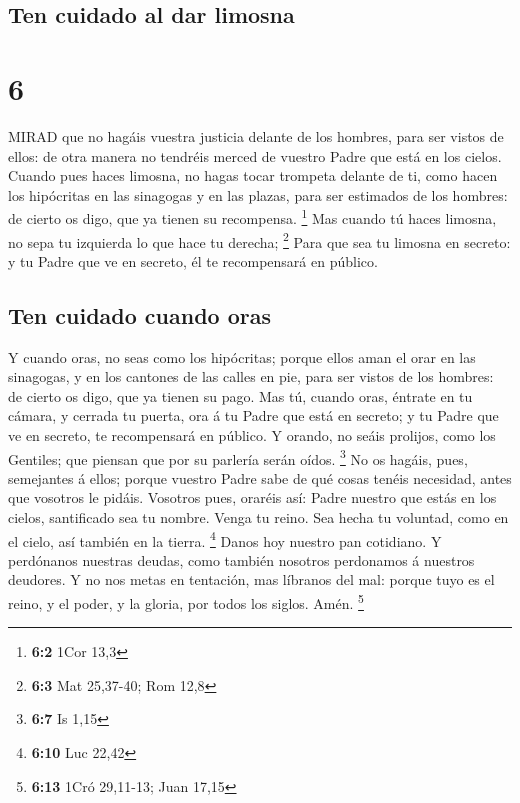 \hypertarget{ten-cuidado-al-dar-limosna}{%
\subsection{Ten cuidado al dar
limosna}\label{ten-cuidado-al-dar-limosna}}

\hypertarget{section-5}{%
\section{6}\label{section-5}}

 MIRAD que no hagáis vuestra justicia delante de los
hombres, para ser vistos de ellos: de otra manera no tendréis merced de
vuestro Padre que está en los cielos.  Cuando pues haces
limosna, no hagas tocar trompeta delante de ti, como hacen los
hipócritas en las sinagogas y en las plazas, para ser estimados de los
hombres: de cierto os digo, que ya tienen su recompensa. \footnote{\textbf{6:2}
  1Cor 13,3}  Mas cuando tú haces limosna, no sepa tu
izquierda lo que hace tu derecha; \footnote{\textbf{6:3} Mat 25,37-40;
  Rom 12,8}  Para que sea tu limosna en secreto: y tu Padre
que ve en secreto, él te recompensará en público.

\hypertarget{ten-cuidado-cuando-oras}{%
\subsection{Ten cuidado cuando oras}\label{ten-cuidado-cuando-oras}}

 Y cuando oras, no seas como los hipócritas; porque ellos
aman el orar en las sinagogas, y en los cantones de las calles en pie,
para ser vistos de los hombres: de cierto os digo, que ya tienen su
pago.  Mas tú, cuando oras, éntrate en tu cámara, y cerrada
tu puerta, ora á tu Padre que está en secreto; y tu Padre que ve en
secreto, te recompensará en público.  Y orando, no seáis
prolijos, como los Gentiles; que piensan que por su parlería serán
oídos. \footnote{\textbf{6:7} Is 1,15}  No os hagáis, pues,
semejantes á ellos; porque vuestro Padre sabe de qué cosas tenéis
necesidad, antes que vosotros le pidáis.  Vosotros pues,
oraréis así: Padre nuestro que estás en los cielos, santificado sea tu
nombre.  Venga tu reino. Sea hecha tu voluntad, como en el
cielo, así también en la tierra. \footnote{\textbf{6:10} Luc 22,42}
 Danos hoy nuestro pan cotidiano.  Y
perdónanos nuestras deudas, como también nosotros perdonamos á nuestros
deudores.  Y no nos metas en tentación, mas líbranos del
mal: porque tuyo es el reino, y el poder, y la gloria, por todos los
siglos. Amén. \footnote{\textbf{6:13} 1Cró 29,11-13; Juan 17,15}

